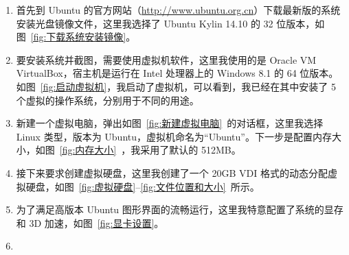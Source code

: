 \documentclass[cs4size,a4paper,nofonts]{ctexart}
\begin{document}
\begin{enumerate}

\item 首先到 Ubuntu 的官方网站（\url{http://www.ubuntu.org.cn}）下载最新版的系统安装光盘镜像文件，这里我选择了 Ubuntu Kylin 14.10 的 32 位版本，如图~\ref{fig:下载系统安装镜像}。

\item 要安装系统并截图，需要使用虚拟机软件，这里我使用的是 Oracle VM VirtualBox，宿主机是运行在 Intel 处理器上的 Windows 8.1 的 64 位版本。如图~\ref{fig:启动虚拟机}，我启动了虚拟机，可以看到，我已经在其中安装了 5 个虚拟的操作系统，分别用于不同的用途。

\begin{figure}[htp]
\end{figure}

\item 新建一个虚拟电脑，弹出如图~\ref{fig:新建虚拟电脑}~的对话框，这里我选择 Linux 类型，版本为 Ubuntu，虚拟机命名为“Ubuntu”。下一步是配置内存大小，如图~\ref{fig:内存大小}~，我采用了默认的 512MB。

\begin{figure}[htp]
\end{figure}

\item 接下来要求创建虚拟硬盘，这里我创建了一个 20GB VDI 格式的动态分配虚拟硬盘，如图~\ref{fig:虚拟硬盘}--\ref{fig:文件位置和大小}~所示。

\begin{figure}[htp]
\end{figure}

\begin{figure}[htp]
\end{figure}

\item 为了满足高版本 Ubuntu 图形界面的流畅运行，这里我特意配置了系统的显存和 3D 加速，如图~\ref{fig:显卡设置}。

\item 

\begin{figure}[htp]
\end{figure}


\end{enumerate}
\end{document}

